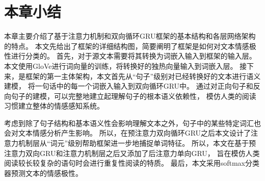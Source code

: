 \section{本章小结}
本章主要介绍了基于注意力机制和双向循环GRU框架的基本结构和各层网络架构的特点。
本文先给出了框架的详细结构图，简要阐明了框架是如何对文本情感极性进行分类的。
首先，对于源文本需要将其转换为词嵌入输入到框架的输入层。
本文使用GloVe进行词向量的训练，将转换好的独热向量输入到词嵌入层。
接下来，是框架的第一主体架构，本文首先从“句子”级别对已经转换好的文本进行语义建模，
将一句话中的每一个词嵌入输入到双向循环GRU中。
通过对正向句子和反向句子的建模，可以完整地建立起理解句子的根本语义依赖性，
模仿人类的阅读习惯建立整体的情感感知系统。

考虑到除了句子结构和基本语义性会影响理解文本之外，句子中的某些特定词汇也会对文本情感分析产生影响。
所以，在预注意力双向循环GRU之后本文设计了注意力机制层从“词元”级别帮助框架进一步地捕捉单词特征。
所以，本文在基于预注意力双向GRU和注意力机制层之后又添加了后注意力单向GRU，
旨在模仿人类阅读较长较复杂的语句时会进行重复性阅读的特质。
最后，本文采用softmax分类器预测文本的情感极性。
